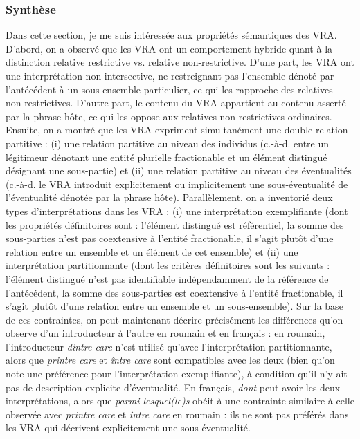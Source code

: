 \subsubsection{Synthèse}
Dans cette section, je me suis intéressée aux propriétés sémantiques des VRA. D'abord, on a observé que les VRA ont un comportement hybride quant à la distinction relative restrictive vs. relative non-restrictive. D'une part, les VRA ont une interprétation non-intersective, ne restreignant pas l'ensemble dénoté par l'antécédent à un sous-ensemble particulier, ce qui les rapproche des relatives non-restrictives. D'autre part, le contenu du VRA appartient au contenu asserté par la phrase hôte, ce qui les oppose aux relatives non-restrictives ordinaires. Ensuite, on a montré que les VRA expriment simultanément une double relation partitive : (i) une relation partitive au niveau des individus (c.-à-d. entre un légitimeur dénotant une entité plurielle fractionable et un élément distingué désignant une sous-partie) et (ii) une relation partitive au niveau des éventualités (c.-à-d. le VRA introduit explicitement ou implicitement une sous-éventualité de l'éventualité dénotée par la phrase hôte). Parallèlement, on a inventorié deux types d'interprétations dans les VRA : (i) une interprétation exemplifiante (dont les propriétés définitoires sont : l'élément distingué est référentiel, la somme des sous-parties n'est pas coextensive à l'entité fractionable, il s'agit plutôt d'une relation entre un ensemble et un élément de cet ensemble) et (ii) une interprétation partitionnante (dont les critères définitoires sont les suivants : l'élément distingué n'est pas identifiable indépendamment de la référence de l'antécédent, la somme des sous-parties est coextensive à l'entité fractionable, il s'agit plutôt d'une relation entre un ensemble et un sous-ensemble). Sur la base de ces contraintes, on peut maintenant décrire précisément les différences qu'on observe d'un introducteur à l'autre en roumain et en français : en roumain, l'introducteur \textit{dintre care} n'est utilisé qu'avec l'interprétation partitionnante, alors que \textit{printre care} et \textit{între care} sont compatibles avec les deux (bien qu'on note une préférence pour l'interprétation exemplifiante), à condition qu'il n'y ait pas de description explicite d'éventualité. En français, \textit{dont} peut avoir les deux interprétations, alors que \textit{parmi lesquel(le)s} obéit à une contrainte similaire à celle observée avec \textit{printre care} et \textit{între care} en roumain : ils ne sont pas préférés dans les VRA qui décrivent explicitement une sous-éventualité. 

